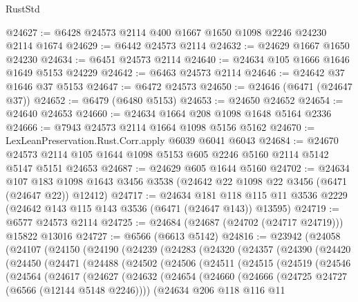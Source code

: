 \begin{lexlean}{RustStd}
\begin{coremodule}
{\begin{coremodule}
{{{{{{{{{{{{{{{{{{{{{{{{{{@24627 := @6428 @24573 @2114 @400 @1667 @1650 @1098 @2246 @24230 @2114 @1674
@24629 := @6442 @24573 @2114
@24632 := @24629 @1667 @1650 @24230
@24634 := @6451 @24573 @2114
@24640 := @24634 @105 @1666 @1646 @1649 @5153 @24229
@24642 := @6463 @24573 @2114
@24646 := @24642 @37 @1646 @37 @5153
@24647 := @6472 @24573
@24650 := @24646 (@6471 (@24647 @37))
@24652 := @6479 (@6480 @5153)
@24653 := @24650 @24652
@24654 := @24640 @24653
@24660 := @24634 @1664 @208 @1098 @1648 @5164 @2336
@24666 := @7943 @24573 @2114 @1664 @1098 @5156 @5162
@24670 := LexLeanPreservation.Rust.Corr.apply @6039 @6041 @6043
@24684 := @24670 @24573 @2114 @105 @1644 @1098 @5153 @605 @2246 @5160 @2114 @5142 @5147 @5151 @24653
@24687 := @24629 @605 @1644 @5160
@24702 := @24634
    @107
    @183
    @1098
    @1643
    @3456
    @3538
    (@24642 @22 @1098 @22 @3456 (@6471 (@24647 @22)) @12412)
@24717 := @24634
    @181
    @118
    @115
    @11
    @3536
    @2229
    (@24642 @143 @115 @143 @3536 (@6471 (@24647 @143)) @13595)
@24719 := @6577 @24573 @2114
@24725 := @24684 (@24687 (@24702 (@24717 @24719))) @15822 @13016
@24727 := @6566 (@6613 @5142)
@24816 := @23942
    (@24058
      (@24107
        (@24150
          (@24190
            (@24239
              (@24283
                (@24320
                  (@24357
                    (@24390
                      (@24420
                        (@24450
                          (@24471
                            (@24488
                              (@24502
                                (@24506
                                  (@24511
                                    (@24515
                                      (@24519
                                        (@24546
                                          (@24564
                                            (@24617
                                              (@24627
                                                (@24632
                                                  (@24654
                                                    (@24660
                                                      (@24666
                                                        (@24725
                                                          @24727
                                                          (@6566 (@12144 @5148 @2246))))
                                                      (@24634
                                                        @206
                                                        @118
                                                        @116
                                                        @11
}}}}}}}}}}}}}}}}}}}}}}}}}}
\end{coremodule}}
\end{coremodule}
\end{lexlean}
